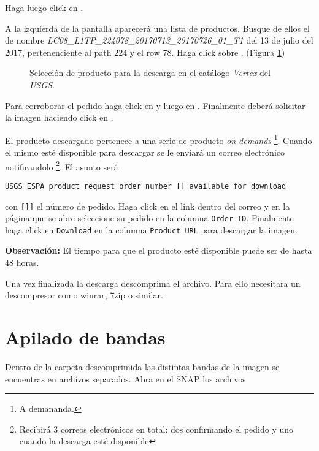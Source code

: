 Haga luego click en .

A la izquierda de la pantalla aparecerá una lista de productos. Busque de ellos el de nombre \emph{LC08\_L1TP\_224078\_20170713\_20170726\_01\_T1
} del 13 de julio del 2017, pertenenciente al path 224 y el row 78. Haga click sobre . (Figura \ref{fig:seleccion})

\begin{figure}[h!]
    \centering
    \caption{Selección de producto para la descarga en el catálogo \emph{Vertex} del \emph{USGS}.}
    \label{fig:seleccion}
\end{figure}

Para corroborar el pedido haga click en  y luego en . Finalmente deberá solicitar la imagen haciendo click en .

El producto descargado pertenece a una serie de producto \emph{on demands} \footnote{A demananda.}. Cuando el mismo esté disponible para descargar se le enviará un correo electrónico notificandolo \footnote{Recibirá 3 correos electrónicos en total: dos confirmando el pedido y uno cuando la descarga esté disponible}. El asunto será

\begin{center}
\texttt{USGS ESPA product request order number [] available for download}
\end{center}

con \texttt{[]]} el número de pedido. Haga click en el link dentro del correo y en la página que se abre seleccione su pedido en la columna \texttt{Order ID}. Finalmente haga click en \texttt{Download} en la columna \texttt{Product URL} para descargar la imagen.

\textbf{Observación:} El tiempo para que el producto esté disponible puede ser de hasta 48 horas.

Una vez finalizada la descarga descomprima el archivo. Para ello necesitara un descompresor como winrar, 7zip o similar.

\section{Apilado de bandas}
Dentro de la carpeta descomprimida las distintas bandas de la imagen se encuentras en archivos separados. Abra en el SNAP los archivos

